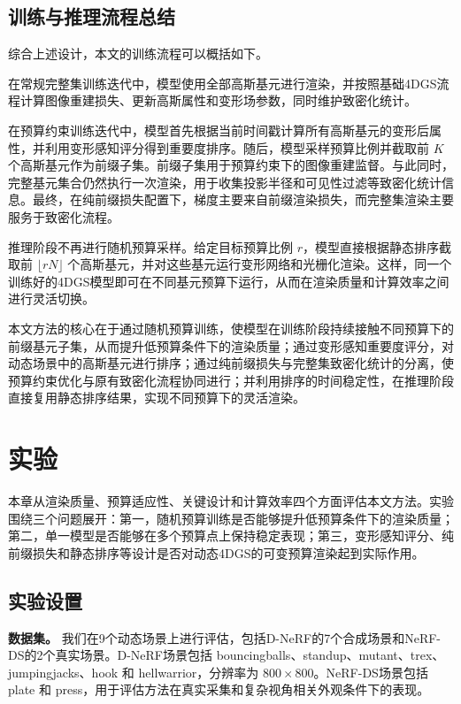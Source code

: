 \documentclass[sn-mathphys]{sn-jnl}
\begin{document}
\subsection{训练与推理流程总结}
\label{sec:summary}

综合上述设计，本文的训练流程可以概括如下。

在常规完整集训练迭代中，模型使用全部高斯基元进行渲染，并按照基础4DGS流程计算图像重建损失、更新高斯属性和变形场参数，同时维护致密化统计。

在预算约束训练迭代中，模型首先根据当前时间戳计算所有高斯基元的变形后属性，并利用变形感知评分得到重要度排序。随后，模型采样预算比例并截取前 $K$ 个高斯基元作为前缀子集。前缀子集用于预算约束下的图像重建监督。与此同时，完整基元集合仍然执行一次渲染，用于收集投影半径和可见性过滤等致密化统计信息。最终，在纯前缀损失配置下，梯度主要来自前缀渲染损失，而完整集渲染主要服务于致密化流程。

推理阶段不再进行随机预算采样。给定目标预算比例 $r$，模型直接根据静态排序截取前 $\lfloor rN \rfloor$ 个高斯基元，并对这些基元运行变形网络和光栅化渲染。这样，同一个训练好的4DGS模型即可在不同基元预算下运行，从而在渲染质量和计算效率之间进行灵活切换。

本文方法的核心在于通过随机预算训练，使模型在训练阶段持续接触不同预算下的前缀基元子集，从而提升低预算条件下的渲染质量；通过变形感知重要度评分，对动态场景中的高斯基元进行排序；通过纯前缀损失与完整集致密化统计的分离，使预算约束优化与原有致密化流程协同进行；并利用排序的时间稳定性，在推理阶段直接复用静态排序结果，实现不同预算下的灵活渲染。

\section{实验}
\label{sec:experiments}

本章从渲染质量、预算适应性、关键设计和计算效率四个方面评估本文方法。实验围绕三个问题展开：第一，随机预算训练是否能够提升低预算条件下的渲染质量；第二，单一模型是否能够在多个预算点上保持稳定表现；第三，变形感知评分、纯前缀损失和静态排序等设计是否对动态4DGS的可变预算渲染起到实际作用。

\subsection{实验设置}
\label{sec:setup}

\textbf{数据集。}
我们在9个动态场景上进行评估，包括D-NeRF的7个合成场景和NeRF-DS的2个真实场景。D-NeRF场景包括 bouncingballs、standup、mutant、trex、jumpingjacks、hook 和 hellwarrior，分辨率为 $800 \times 800$。NeRF-DS场景包括 plate 和 press，用于评估方法在真实采集和复杂视角相关外观条件下的表现。
\end{document}
